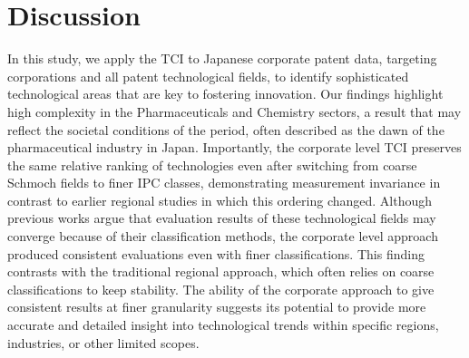 \documentclass[fleqn,10pt]{wlscirep}
\begin{document}
\section*{Discussion} \label{section:Discussion}

In this study, we apply the TCI to Japanese corporate patent data, targeting corporations and all patent technological fields, to identify sophisticated technological areas that are key to fostering innovation.  
Our findings highlight high complexity in the Pharmaceuticals and Chemistry sectors, a result that may reflect the societal conditions of the period, often described as the dawn of the pharmaceutical industry in Japan.  
Importantly, the corporate level TCI preserves the same relative ranking of technologies even after switching from coarse Schmoch fields to finer IPC classes, demonstrating measurement invariance in contrast to earlier regional studies in which this ordering changed.  
Although previous works argue that evaluation results of these technological fields may converge because of their classification methods\cite{Hidalgo2021}, the corporate level approach produced consistent evaluations even with finer classifications.  
This finding contrasts with the traditional regional approach, which often relies on coarse classifications to keep stability.  
The ability of the corporate approach to give consistent results at finer granularity suggests its potential to provide more accurate and detailed insight into technological trends within specific regions, industries, or other limited scopes.
\end{document}
